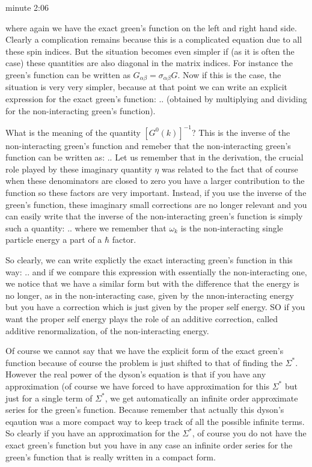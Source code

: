 \documentclass[../main/main.tex]{subfiles}
\begin{document}
minute 2:06

















where again we have the exact green's function on the left and right hand side. Clearly a complication remains because this is a complicated equation due to all these spin indices. But the situation becomes even simpler if (as it is often the case) these quantities are also diagonal in the matrix indices. For instance the green's function can be written as \( G_{\alpha \beta } = \sigma _{\alpha \beta } G\). Now if this is the case, the situation is very very simpler, because at that point we can write an explicit expression for the exact green's function:
..
(obtained by multiplying and dividing for the non-interacting green's function).

What is the meaning of the quantity \( [G^0(k)]^{-1} \)? This is the inverse of the non-interacting green's function and remeber that the non-interacting green's function can be written as:
..
Let us remember that in the derivation, the crucial role played by these imaginary quantity \( \eta  \) was related to the fact that of course when these denominators are closed to zero you have a larger contribution to the function so these factors are very important. Instead, if you use the inverse of the green's function, these imaginary small corrections are no longer relevant and you can easily write that the inverse of the non-interacting green's function is simply such a quantity:
..
where we remember that \( \omega _k \) is the non-interacting  single particle energy a part of a \( \hbar  \) factor.

So clearly, we can write explictly the exact interacting green's function in this way:
..
and if we compare this expression with essentially the non-interacting one, we notice that we have a similar form but with the difference that the energy is no longer, as in the non-interacting case, given by the nnon-interacting energy but you have a correction which is just given by the proper self energy. SO if you want the proper self energy plays the role of an additive correction, called additive renormalization, of the non-interacting energy.

Of course we cannot say that we have the explicit form of the exact green's function because of course the problem is just shifted to that of finding the \( \Sigma ^* \). However the real power of the dyson's equation is that if you have any approximation (of course we have forced to have approximation for this \( \Sigma ^* \) but just for a single term of \( \Sigma ^* \), we get automatically an infinite order approximate series for the green's function. Because remember that actually this dyson's eqaution was a more compact way to keep track of all the possible infinite terms. So clearly if you have an approximation for the \( \Sigma ^* \), of course you do not have the exact green's function but you have in any case an infinite order series for the green's function that is really written in a compact form.
\end{document}
